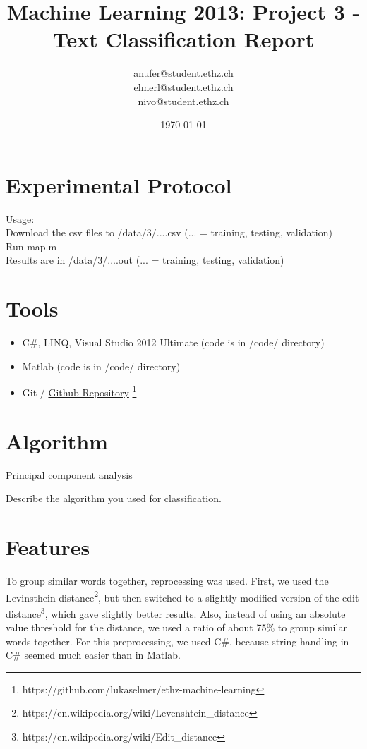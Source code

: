 \documentclass[a4paper, 11pt]{article}
\title{Machine Learning 2013: Project 3 - Text Classification Report}
\author{anufer@student.ethz.ch\\ elmerl@student.ethz.ch\\ nivo@student.ethz.ch\\}
\date{\today}
\begin{document}
\maketitle

\section*{Experimental Protocol}
Usage:\\
Download the csv files to /data/3/....csv (... = training, testing, validation)\\
Run map.m \\
Results are in /data/3/....out (... = training, testing, validation)










\section{Tools}

\begin{itemize}
\item C\#, LINQ, Visual Studio 2012 Ultimate (code is in /code/ directory)
\item Matlab (code is in /code/ directory)
\item Git / \href{https://github.com/lukaselmer/ethz-machine-learning}{Github Repository} \footnote{https://github.com/lukaselmer/ethz-machine-learning}
\end{itemize}

\section{Algorithm}

Principal component analysis

Describe the algorithm you used for classification.

\section{Features}
To group similar words together, reprocessing was used. First, we used the Levinsthein distance\footnote{https://en.wikipedia.org/wiki/Levenshtein\_distance}, but then switched to a slightly modified version of the edit distance\footnote{https://en.wikipedia.org/wiki/Edit\_distance}, which gave slightly better results. Also, instead of using an absolute value threshold for the distance, we used a ratio of about 75\% to group similar words together. For this preprocessing, we used C\#, because string handling in C\# seemed much easier than in Matlab.\\
\end{document}
